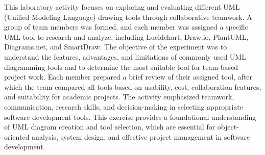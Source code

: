 This laboratory activity focuses on exploring and evaluating different UML (Unified Modeling Language) drawing tools through collaborative teamwork. A group of team members was formed, and each member was assigned a specific UML tool to research and analyze, including Lucidchart, Draw.io, PlantUML, Diagrams.net, and SmartDraw. The objective of the experiment was to understand the features, advantages, and limitations of commonly used UML diagramming tools and to determine the most suitable tool for team-based project work. Each member prepared a brief review of their assigned tool, after which the team compared all tools based on usability, cost, collaboration features, and suitability for academic projects. The activity emphasized teamwork, communication, research skills, and decision-making in selecting appropriate software development tools. This exercise provides a foundational understanding of UML diagram creation and tool selection, which are essential for object-oriented analysis, system design, and effective project management in software development.